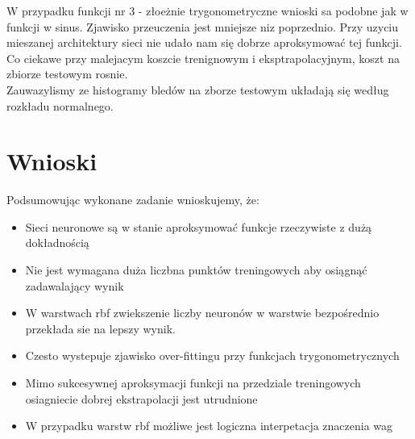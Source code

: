 \documentclass{classrep}
\begin{document}
{        W przypadku funkcji nr 3 - złoeżnie trygonometryczne wnioski sa podobne jak w funkcji w sinus. Zjawisko przeuczenia jest mniejsze niz poprzednio.
        Przy uzyciu mieszanej architektury sieci nie udało nam się dobrze aproksymować tej funkcji. Co ciekawe przy malejacym koszcie trenignowym
        i eksptrapolacyjnym, koszt na zbiorze testowym rosnie. \\

        Zauwazylismy ze histogramy bledów na zborze testowym układają się według rozkładu normalnego.\\

    }
    \section{Wnioski}
    {
        Podsumowując wykonane zadanie wnioskujemy, że:
        \begin{itemize}
            \item Sieci neuronowe są w stanie aproksymować funkcje rzeczywiste z dużą dokładnością
            \item Nie jest wymagana duża liczbna punktów treningowych aby osiągnąć zadawalający wynik
            \item W warstwach rbf zwiekszenie liczby neuronów w warstwie bezpośrednio przekłada sie na lepszy wynik.
            \item Czesto wystepuje zjawisko over-fittingu przy funkcjach trygonometrycznych
            \item Mimo sukcesywnej aproksymacji funkcji na przedziale treningowych osiagniecie dobrej ekstrapolacji jest utrudnione
            \item W przypadku warstw rbf możliwe jest logiczna interpetacja znaczenia wag
        \end{itemize}
    }
    \begin{thebibliography}{0}
    \end{thebibliography}
\end{document}
